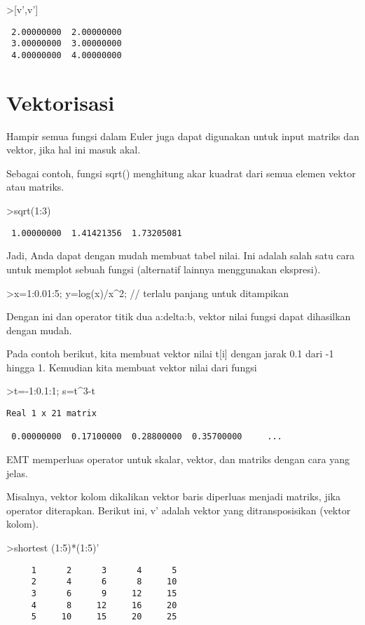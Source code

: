 \documentclass[
]{book}
\begin{document}
\textgreater{[}v',v'{]}

\begin{verbatim}
 2.00000000  2.00000000 
 3.00000000  3.00000000 
 4.00000000  4.00000000 
\end{verbatim}

\chapter{Vektorisasi}\label{vektorisasi}

Hampir semua fungsi dalam Euler juga dapat digunakan untuk input matriks dan vektor, jika hal ini masuk akal.

Sebagai contoh, fungsi sqrt() menghitung akar kuadrat dari semua elemen vektor atau matriks.

\textgreater sqrt(1:3)

\begin{verbatim}
 1.00000000  1.41421356  1.73205081 
\end{verbatim}

Jadi, Anda dapat dengan mudah membuat tabel nilai. Ini adalah salah satu cara untuk memplot sebuah fungsi (alternatif lainnya menggunakan ekspresi).

\textgreater x=1:0.01:5; y=log(x)/x\^{}2; // terlalu panjang untuk ditampikan

Dengan ini dan operator titik dua a:delta:b, vektor nilai fungsi dapat dihasilkan dengan mudah.

Pada contoh berikut, kita membuat vektor nilai t{[}i{]} dengan jarak 0.1 dari -1 hingga 1. Kemudian kita membuat vektor nilai dari fungsi

\textgreater t=-1:0.1:1; s=t\^{}3-t

\begin{verbatim}
Real 1 x 21 matrix

 0.00000000  0.17100000  0.28800000  0.35700000     ...
\end{verbatim}

EMT memperluas operator untuk skalar, vektor, dan matriks dengan cara yang jelas.

Misalnya, vektor kolom dikalikan vektor baris diperluas menjadi matriks, jika operator diterapkan. Berikut ini, v' adalah vektor yang ditransposisikan (vektor kolom).

\textgreater shortest (1:5)*(1:5)'

\begin{verbatim}
     1      2      3      4      5 
     2      4      6      8     10 
     3      6      9     12     15 
     4      8     12     16     20 
     5     10     15     20     25 
\end{verbatim}
\end{document}
